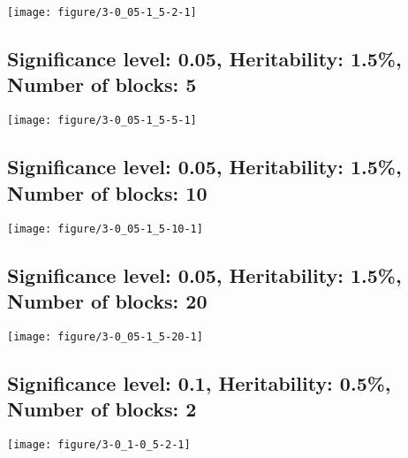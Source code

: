 \documentclass[11pt,letter]{article}\usepackage[]{graphicx}\usepackage[]{color}
\makeatletter
\def\maxwidth{ %
  \ifdim\Gin@nat@width>\linewidth
    \linewidth
  \else
    \Gin@nat@width
  \fi
}
\newenvironment{knitrout}{}{} %
\makeatother
\begin{document}
\begin{knitrout}
\color{fgcolor}
\texttt{[image: figure/3-0\_05-1\_5-2-1]} 

\end{knitrout}

\newpage
\subsection{Significance level: 0.05, Heritability: 1.5\%, Number of blocks: 5}

\begin{knitrout}
\color{fgcolor}
\texttt{[image: figure/3-0\_05-1\_5-5-1]} 

\end{knitrout}

\newpage
\subsection{Significance level: 0.05, Heritability: 1.5\%, Number of blocks: 10}

\begin{knitrout}
\color{fgcolor}
\texttt{[image: figure/3-0\_05-1\_5-10-1]} 

\end{knitrout}

\newpage
\subsection{Significance level: 0.05, Heritability: 1.5\%, Number of blocks: 20}

\begin{knitrout}
\color{fgcolor}
\texttt{[image: figure/3-0\_05-1\_5-20-1]} 

\end{knitrout}

\newpage
\subsection{Significance level: 0.1, Heritability: 0.5\%, Number of blocks: 2}

\begin{knitrout}
\color{fgcolor}
\texttt{[image: figure/3-0\_1-0\_5-2-1]} 

\end{knitrout}
\end{document}
